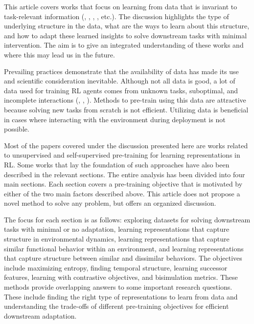 \documentclass{article}
\begin{document}
This article covers works that focus on learning from data that is invariant to task-relevant information (\cite{zisselman2023explore}, \cite{wilcoxson2024leveraging}, \cite{rudolph2024learning}, \cite{laskin2020curl}, etc.). The discussion highlights the type of underlying structure in the data, what are the ways to learn about this structure, and how to adapt these learned insights to solve downstream tasks with minimal intervention. The aim is to give an integrated understanding of these works and where this may lead us in the future.

Prevailing practices demonstrate that the availability of data has made its use and scientific consideration inevitable. Although not all data is good, a lot of data used for training RL agents comes from unknown tasks, suboptimal, and incomplete interactions (\cite{hansen2022bisimulation}, \cite{park2024foundation}, \cite{li2023accelerating}). Methods to pre-train using this data are attractive because solving new tasks from scratch is not efficient. Utilizing data is beneficial in cases where interacting with the environment during deployment is not possible. 

Most of the papers covered under the discussion presented here are works related to unsupervised and self-supervised pre-training for learning representations in RL. Some works that lay the foundation of such approaches have also been described in the relevant sections. The entire analysis has been divided into four main sections. Each section covers a pre-training objective that is motivated by either of the two main factors described above. This article does not propose a novel method to solve any problem, but offers an organized discussion.
 
The focus for each section is as follows: exploring datasets for solving downstream tasks with minimal or no adaptation, learning representations that capture structure in environmental dynamics, learning representations that capture similar functional behavior within an environment, and learning representations that capture structure between similar and dissimilar behaviors. The objectives include maximizing entropy, finding temporal structure, learning successor features, learning with contrastive objectives, and bisimulation metrics. These methods provide overlapping answers to some important research questions. These include finding the right type of representations to learn from data and understanding the trade-offs of different pre-training objectives for efficient downstream adaptation. 
\end{document}
